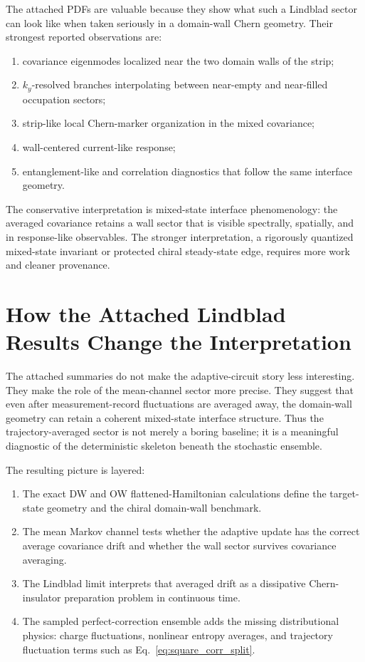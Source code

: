 \documentclass[aps,prb,onecolumn,nofootinbib,superscriptaddress]{revtex4-2}
\begin{document}
The attached PDFs are valuable because they show what such a Lindblad sector can
look like when taken seriously in a domain-wall Chern geometry.  Their strongest
reported observations are:
\begin{enumerate}
\item covariance eigenmodes localized near the two domain walls of the strip;
\item \(k_y\)-resolved branches interpolating between near-empty and near-filled
occupation sectors;
\item strip-like local Chern-marker organization in the mixed covariance;
\item wall-centered current-like response;
\item entanglement-like and correlation diagnostics that follow the same
interface geometry.
\end{enumerate}
The conservative interpretation is mixed-state interface phenomenology: the
averaged covariance retains a wall sector that is visible spectrally, spatially,
and in response-like observables.  The stronger interpretation, a rigorously
quantized mixed-state invariant or protected chiral steady-state edge, requires
more work and cleaner provenance.

\section{How the Attached Lindblad Results Change the Interpretation}

The attached summaries do not make the adaptive-circuit story less interesting.
They make the role of the mean-channel sector more precise.  They suggest that
even after measurement-record fluctuations are averaged away, the domain-wall
geometry can retain a coherent mixed-state interface structure.  Thus the
trajectory-averaged sector is not merely a boring baseline; it is a meaningful
diagnostic of the deterministic skeleton beneath the stochastic ensemble.

The resulting picture is layered:
\begin{enumerate}
\item The exact DW and OW flattened-Hamiltonian calculations define the
target-state geometry and the chiral domain-wall benchmark.
\item The mean Markov channel tests whether the adaptive update has the correct
average covariance drift and whether the wall sector survives covariance
averaging.
\item The Lindblad limit interprets that averaged drift as a dissipative
Chern-insulator preparation problem in continuous time.
\item The sampled perfect-correction ensemble adds the missing distributional
physics: charge fluctuations, nonlinear entropy averages, and trajectory
fluctuation terms such as Eq.~\eqref{eq:square_corr_split}.
\end{enumerate}
\end{document}

